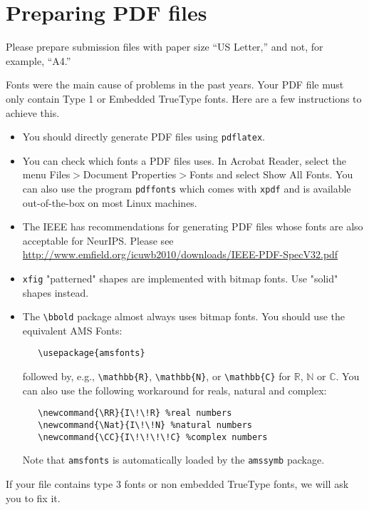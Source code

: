 \documentclass{article}
\begin{document}
\section{Preparing PDF files}

Please prepare submission files with paper size ``US Letter,'' and not, for
example, ``A4.''

Fonts were the main cause of problems in the past years. Your PDF file must only
contain Type 1 or Embedded TrueType fonts. Here are a few instructions to
achieve this.

\begin{itemize}

\item You should directly generate PDF files using \verb+pdflatex+.

\item You can check which fonts a PDF files uses.  In Acrobat Reader, select the
  menu Files$>$Document Properties$>$Fonts and select Show All Fonts. You can
  also use the program \verb+pdffonts+ which comes with \verb+xpdf+ and is
  available out-of-the-box on most Linux machines.

\item The IEEE has recommendations for generating PDF files whose fonts are also
  acceptable for NeurIPS. Please see
  \url{http://www.emfield.org/icuwb2010/downloads/IEEE-PDF-SpecV32.pdf}

\item \verb+xfig+ "patterned" shapes are implemented with bitmap fonts.  Use
  "solid" shapes instead.

\item The \verb+\bbold+ package almost always uses bitmap fonts.  You should use
  the equivalent AMS Fonts:
\begin{verbatim}
   \usepackage{amsfonts}
\end{verbatim}
followed by, e.g., \verb+\mathbb{R}+, \verb+\mathbb{N}+, or \verb+\mathbb{C}+
for $\mathbb{R}$, $\mathbb{N}$ or $\mathbb{C}$.  You can also use the following
workaround for reals, natural and complex:
\begin{verbatim}
   \newcommand{\RR}{I\!\!R} %real numbers
   \newcommand{\Nat}{I\!\!N} %natural numbers
   \newcommand{\CC}{I\!\!\!\!C} %complex numbers
\end{verbatim}
Note that \verb+amsfonts+ is automatically loaded by the \verb+amssymb+ package.

\end{itemize}

If your file contains type 3 fonts or non embedded TrueType fonts, we will ask
you to fix it.
\end{document}
